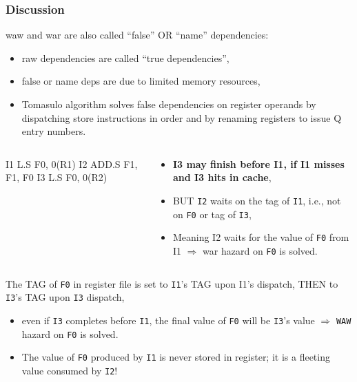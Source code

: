 \documentclass{beamer}
\newcommand{\emp}[1]{\textcolor{DikuRed}{ #1}}
\newcommand{\emphh}[1]{\textcolor{CosGreen}{ #1}}
\begin{document}
\begin{frame}[fragile,t]
\frametitle{Discussion}

{\sc waw} and {\sc war} are also called ``false'' OR ``name'' dependencies:
\begin{itemize}
    \item {\sc raw} dependencies are called ``true dependencies'',
    \item false or name deps are due to limited memory resources,
    \item Tomasulo algorithm solves false dependencies 
            on register operands by dispatching
            store instructions in order and 
            by renaming registers to issue Q entry numbers.
\end  {itemize}
\medskip

\begin{columns}
\begin{colorcode}[fontsize=\scriptsize]
I1   L.S   F0,  0(R1)
I2   ADD.S F1, F1, F0
I3   L.S   F0,  0(R2)
\end{colorcode} 
\begin{scriptsize}
\begin{itemize}
    \item \emp{\bf I3 may finish before I1, if I1 misses and I3 hits in cache},\pause
    \item \emphh{BUT {\tt I2} waits on the tag of {\tt I1}, 
            i.e., not on {\tt F0} or tag of {\tt I3},}
    \item Meaning I2 waits for the value of {\tt F0} from I1 $\Rightarrow$
            {\sc war} hazard on {\tt F0} is solved.
\end{itemize}
\end{scriptsize}
\end{columns}
\bigskip

The TAG of {\tt F0} in register file is set to {\tt I1}'s TAG upon I1's dispatch, 
THEN to {\tt I3}'s TAG upon {\tt I3}  dispatch,
\begin{itemize}
    \item \emphh{even if {\tt I3} completes before {\tt I1}, the final
            value of {\tt F0} will be {\tt I3}'s value $\Rightarrow$ {\tt WAW}
            hazard on {\tt F0} is solved.} 
    \item \emphh{The value of {\tt F0} produced by {\tt I1} is never stored in register;
            it is a fleeting value consumed by {\tt I2}!}
\end  {itemize}
\end{frame}
\end{document}
